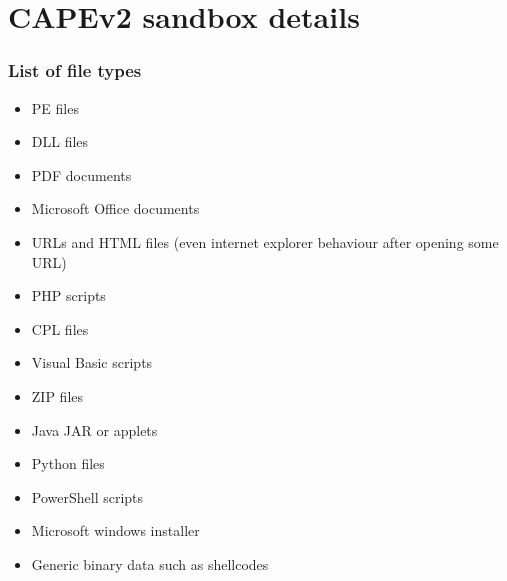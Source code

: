 \chapter{CAPEv2 sandbox details} \label{app:cape}

\subsection*{List of file types}
\begin{itemize}
    \itemsep0em 
    \item PE files
    \item DLL files
    \item PDF documents
    \item Microsoft Office documents
    \item URLs and HTML files (even internet explorer behaviour after opening some URL)
    \item PHP scripts
    \item CPL files
    \item Visual Basic scripts
    \item ZIP files
    \item Java JAR or applets
    \item Python files 
    \item PowerShell scripts
    \item Microsoft windows installer
    \item Generic binary data such as shellcodes
  \end{itemize}

\newpage

